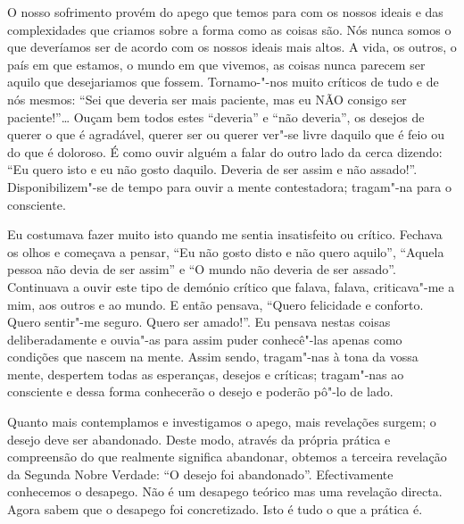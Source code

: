 O nosso sofrimento provém do apego que temos para com os nossos ideais e das
complexidades que criamos sobre a forma como as coisas são. Nós nunca somos o
que deveríamos ser de acordo com os nossos ideais mais altos. A vida, os outros,
o país em que estamos, o mundo em que vivemos, as coisas nunca parecem ser
aquilo que desejariamos que fossem. Tornamo-"-nos muito críticos de tudo e de nós
mesmos: “Sei que deveria ser mais paciente, mas eu NÃO consigo ser
paciente!”\ldots{} Ouçam bem todos estes “deveria” e “não deveria”, os desejos
de querer o que é agradável, querer ser ou querer ver"-se livre daquilo que é
feio ou do que é doloroso. É como ouvir alguém a falar do outro lado da cerca
dizendo: “Eu quero isto e eu não gosto daquilo. Deveria de ser assim e não
assado!”. Disponibilizem"-se de tempo para ouvir a mente contestadora; tragam"-na
para o consciente.

Eu costumava fazer muito isto quando me sentia insatisfeito ou crítico. Fechava
os olhos e começava a pensar, “Eu não gosto disto e não quero aquilo”, “Aquela
pessoa não devia de ser assim” e “O mundo não deveria de ser assado”. Continuava
a ouvir este tipo de demónio crítico que falava, falava, criticava"-me a mim, aos
outros e ao mundo. E então pensava, “Quero felicidade e conforto. Quero
sentir"-me seguro. Quero ser amado!”. Eu pensava nestas coisas deliberadamente e
ouvia"-as para assim puder conhecê"-las apenas como condições que nascem na mente.
Assim sendo, tragam"-nas à tona da vossa mente, despertem todas as esperanças,
desejos e críticas; tragam"-nas ao consciente e dessa forma conhecerão o desejo e
poderão pô"-lo de lado.

Quanto mais contemplamos e investigamos o apego, mais revelações surgem; o
desejo deve ser abandonado. Deste modo, através da própria prática e compreensão
do que realmente significa abandonar, obtemos a terceira revelação da Segunda
Nobre Verdade: “O desejo foi abandonado”. Efectivamente conhecemos o desapego.
Não é um desapego teórico mas uma revelação directa. Agora sabem que o desapego
foi concretizado. Isto é tudo o que a prática é.

